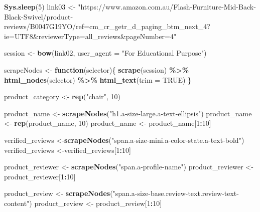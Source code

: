 \documentclass[
]{article}
\newenvironment{Shaded}{\begin{snugshade}}{\end{snugshade}}
\newcommand{\AttributeTok}[1]{\textcolor[rgb]{0.13,0.29,0.53}{#1}}
\newcommand{\ConstantTok}[1]{\textcolor[rgb]{0.56,0.35,0.01}{#1}}
\newcommand{\ControlFlowTok}[1]{\textcolor[rgb]{0.13,0.29,0.53}{\textbf{#1}}}
\newcommand{\DecValTok}[1]{\textcolor[rgb]{0.00,0.00,0.81}{#1}}
\newcommand{\FunctionTok}[1]{\textcolor[rgb]{0.13,0.29,0.53}{\textbf{#1}}}
\newcommand{\NormalTok}[1]{#1}
\newcommand{\OtherTok}[1]{\textcolor[rgb]{0.56,0.35,0.01}{#1}}
\newcommand{\SpecialCharTok}[1]{\textcolor[rgb]{0.81,0.36,0.00}{\textbf{#1}}}
\newcommand{\StringTok}[1]{\textcolor[rgb]{0.31,0.60,0.02}{#1}}
\begin{document}
\begin{Shaded}
\begin{Highlighting}[]
   \FunctionTok{Sys.sleep}\NormalTok{(}\DecValTok{5}\NormalTok{)}
\NormalTok{link03 }\OtherTok{\textless{}{-}} \StringTok{"https://www.amazon.com.au/Flash{-}Furniture{-}Mid{-}Back{-}Black{-}Swivel/product{-}reviews/B0047G19YO/ref=cm\_cr\_getr\_d\_paging\_btm\_next\_4?ie=UTF8\&reviewerType=all\_reviews\&pageNumber=4"}


\NormalTok{  session }\OtherTok{\textless{}{-}} \FunctionTok{bow}\NormalTok{(link02,}
               \AttributeTok{user\_agent =} \StringTok{"For Educational Purpose"}\NormalTok{)}

\NormalTok{  scrapeNodes }\OtherTok{\textless{}{-}} \ControlFlowTok{function}\NormalTok{(selector)\{}
    \FunctionTok{scrape}\NormalTok{(session) }\SpecialCharTok{\%\textgreater{}\%}
      \FunctionTok{html\_nodes}\NormalTok{(selector) }\SpecialCharTok{\%\textgreater{}\%}
      \FunctionTok{html\_text}\NormalTok{(}\AttributeTok{trim =} \ConstantTok{TRUE}\NormalTok{)}
\NormalTok{  \}}

\NormalTok{  product\_category }\OtherTok{\textless{}{-}} \FunctionTok{rep}\NormalTok{(}\StringTok{"chair"}\NormalTok{, }\DecValTok{10}\NormalTok{)}

\NormalTok{  product\_name }\OtherTok{\textless{}{-}} \FunctionTok{scrapeNodes}\NormalTok{(}\StringTok{"h1.a{-}size{-}large.a{-}text{-}ellipsis"}\NormalTok{)}
\NormalTok{  product\_name }\OtherTok{\textless{}{-}} \FunctionTok{rep}\NormalTok{(product\_name, }\DecValTok{10}\NormalTok{)}
\NormalTok{  product\_name }\OtherTok{\textless{}{-}}\NormalTok{ product\_name[}\DecValTok{1}\SpecialCharTok{:}\DecValTok{10}\NormalTok{]}
  
\NormalTok{  verified\_reviews }\OtherTok{\textless{}{-}}\FunctionTok{scrapeNodes}\NormalTok{(}\StringTok{"span.a{-}size{-}mini.a{-}color{-}state.a{-}text{-}bold"}\NormalTok{)}
\NormalTok{  verified\_reviews }\OtherTok{\textless{}{-}}\NormalTok{verified\_reviews[}\DecValTok{1}\SpecialCharTok{:}\DecValTok{10}\NormalTok{]}
  
\NormalTok{  product\_reviewer }\OtherTok{\textless{}{-}} \FunctionTok{scrapeNodes}\NormalTok{(}\StringTok{"span.a{-}profile{-}name"}\NormalTok{)}
\NormalTok{  product\_reviewer }\OtherTok{\textless{}{-}}\NormalTok{ product\_reviewer[}\DecValTok{1}\SpecialCharTok{:}\DecValTok{10}\NormalTok{]}
  
\NormalTok{  product\_review }\OtherTok{\textless{}{-}} \FunctionTok{scrapeNodes}\NormalTok{(}\StringTok{"span.a{-}size{-}base.review{-}text.review{-}text{-}content"}\NormalTok{)}
\NormalTok{  product\_review }\OtherTok{\textless{}{-}}\NormalTok{ product\_review[}\DecValTok{1}\SpecialCharTok{:}\DecValTok{10}\NormalTok{]}
  

\end{Highlighting}
\end{Shaded}
\end{document}

